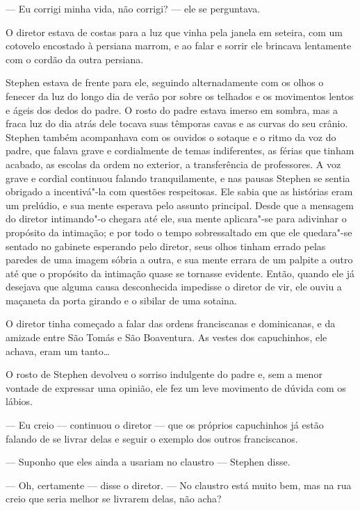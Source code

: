  --- Eu corrigi minha vida, não corrigi? --- ele se perguntava.

\asterisc

O diretor estava de costas para a luz que vinha pela janela em seteira,
com um cotovelo encostado à persiana marrom, e ao falar e sorrir ele
brincava lentamente com o cordão da outra persiana.

Stephen estava de frente para ele, seguindo alternadamente com os olhos
o fenecer da luz do longo dia de verão por sobre os telhados e os
movimentos lentos e ágeis dos dedos do padre. O rosto do padre estava
imerso em sombra, mas a fraca luz do dia atrás dele tocava suas
têmporas cavas e as curvas do seu crânio. Stephen também acompanhava
com os ouvidos o sotaque e o ritmo da voz do padre, que falava grave e
cordialmente de temas indiferentes, as férias que tinham acabado, as
escolas da ordem no exterior, a transferência de professores. A voz
grave e cordial continuou falando tranquilamente, e nas pausas Stephen
se sentia obrigado a incentivá"-la com questões respeitosas. Ele sabia
que as histórias eram um prelúdio, e sua mente esperava pelo assunto
principal. Desde que a mensagem do diretor intimando"-o chegara até ele,
sua mente aplicara"-se para adivinhar o propósito da intimação; e por
todo o tempo sobressaltado em que ele quedara"-se sentado no gabinete
esperando pelo diretor, seus olhos tinham errado pelas paredes de uma
imagem sóbria a outra, e sua mente errara de um palpite a outro até que
o propósito da intimação quase se tornasse evidente. Então, quando ele
já desejava que alguma causa desconhecida impedisse o diretor de vir,
ele ouviu a maçaneta da porta girando e o sibilar de uma sotaina.

O diretor tinha começado a falar das ordens franciscanas e dominicanas,
e da amizade entre São Tomás e São Boaventura. As vestes dos
capuchinhos, ele achava, eram um tanto\ldots{}

O rosto de Stephen devolveu o sorriso indulgente do padre e, sem a menor
vontade de expressar uma opinião, ele fez um leve movimento de dúvida
com os lábios.

 --- Eu creio --- continuou o diretor --- que os próprios capuchinhos já estão
falando de se livrar delas e seguir o exemplo dos outros franciscanos.

 --- Suponho que eles ainda a usariam no claustro --- Stephen disse.

 --- Oh, certamente --- disse o diretor. --- No claustro está muito bem, mas na
rua creio que seria melhor se livrarem delas, não acha?

